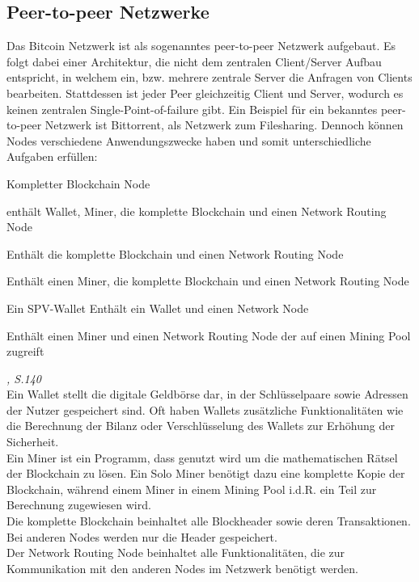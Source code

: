 \subsection{Peer-to-peer Netzwerke}

Das Bitcoin Netzwerk ist als sogenanntes peer-to-peer Netzwerk aufgebaut. Es folgt dabei einer Architektur, die nicht dem zentralen Client/Server Aufbau entspricht, in welchem ein, bzw. mehrere zentrale Server die Anfragen von Clients bearbeiten. Stattdessen ist jeder Peer gleichzeitig Client und Server, wodurch es keinen zentralen Single-Point-of-failure gibt. Ein Beispiel für ein bekanntes peer-to-peer Netzwerk ist Bittorrent, als Netzwerk zum Filesharing. Dennoch können Nodes verschiedene Anwendungszwecke haben und somit unterschiedliche Aufgaben erfüllen:

\begin{labeling}{Kompletter Blockchain Node}
	\item[Referenz Client] enthält Wallet, Miner, die komplette Blockchain und einen Network Routing Node
	\item[Kompletter Blockchain Node] Enthält die komplette Blockchain und einen Network Routing Node
	\item[Solo Miner] Enthält einen Miner, die komplette Blockchain und einen Network Routing Node
	\item[SPV-Wallet] Ein \ac{SPV}-Wallet Enthält ein Wallet und einen Network Node
	\item[Pool mining Node] Enthält einen Miner und einen Network Routing Node der auf einen Mining Pool zugreift
\end{labeling}
\textit{\cite{Antonopoulos.2015}, S.140}\\
Ein Wallet stellt die digitale Geldbörse dar, in der Schlüsselpaare sowie Adressen der Nutzer gespeichert sind. Oft haben Wallets zusätzliche Funktionalitäten wie die Berechnung der Bilanz oder Verschlüsselung des Wallets zur Erhöhung der Sicherheit.\\
Ein Miner ist ein Programm, dass genutzt wird um die mathematischen Rätsel der Blockchain zu lösen. Ein Solo Miner benötigt dazu eine komplette Kopie der Blockchain, während einem Miner in einem Mining Pool i.d.R. ein Teil zur Berechnung zugewiesen wird.\\
Die komplette Blockchain beinhaltet alle Blockheader sowie deren Transaktionen. Bei anderen Nodes werden nur die Header gespeichert.\\
Der Network Routing Node beinhaltet alle Funktionalitäten, die zur Kommunikation mit den anderen Nodes im Netzwerk benötigt werden.

